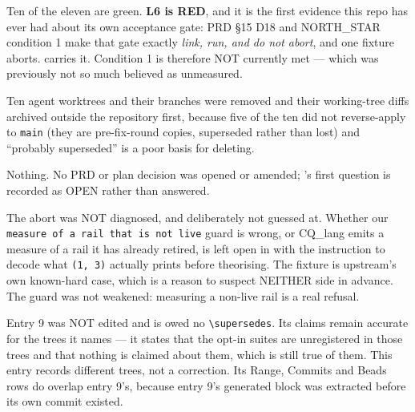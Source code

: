 Ten of the eleven are green. \textbf{L6 is RED}, and it is the first evidence this repo has
ever had about its own acceptance gate: PRD \S15 D18 and NORTH\_STAR condition 1 make that
gate exactly \emph{link, run, and do not abort}, and one fixture aborts.  carries
it. Condition 1 is therefore NOT currently met --- which was previously not so much
believed as unmeasured.

Ten agent worktrees and their branches were removed and their working-tree diffs archived
outside the repository first, because five of the ten did not reverse-apply to \texttt{main}
(they are pre-fix-round copies, superseded rather than lost) and ``probably superseded'' is
a poor basis for deleting.

\begin{figures}
\end{figures}

Nothing. No PRD or plan decision was opened or amended; 's first question is
recorded as OPEN rather than answered.

The abort was NOT diagnosed, and deliberately not guessed at. Whether our
\texttt{measure of a rail that is not live} guard is wrong, or CQ\_lang emits a measure of a
rail it has already retired, is left open in  with the instruction to decode what
\texttt{(1, 3)} actually prints before theorising. The fixture is upstream's own known-hard
case, which is a reason to suspect NEITHER side in advance. The guard was not weakened:
measuring a non-live rail is a real refusal.

Entry 9 was NOT edited and is owed no \texttt{\textbackslash supersedes}. Its claims remain
accurate for the trees it names --- it states that the opt-in suites are unregistered in
those trees and that nothing is claimed about them, which is still true of them. This entry
records different trees, not a correction. Its Range, Commits and Beads rows do overlap
entry 9's, because entry 9's generated block was extracted before its own commit existed.

